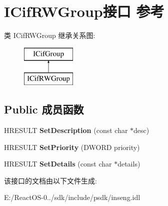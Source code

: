\hypertarget{interface_i_cif_r_w_group}{}\section{I\+Cif\+R\+W\+Group接口 参考}
\label{interface_i_cif_r_w_group}
类 I\+Cif\+R\+W\+Group 继承关系图\+:\begin{figure}[H]
\begin{center}
\leavevmode
\includegraphics[height=2.000000cm]{interface_i_cif_r_w_group}
\end{center}
\end{figure}
\subsection*{Public 成员函数}
\begin{DoxyCompactItemize}
\item 
\mbox{\label{interface_i_cif_r_w_group_a32143fc1e49c200e6232a28ea0071575}} 
H\+R\+E\+S\+U\+LT {\bfseries Set\+Description} (const char $\ast$desc)
\item 
\mbox{\label{interface_i_cif_r_w_group_a27e2ee6c593c26b9dc794818f52ccca5}} 
H\+R\+E\+S\+U\+LT {\bfseries Set\+Priority} (D\+W\+O\+RD priority)
\item 
\mbox{\label{interface_i_cif_r_w_group_af4a89869121225858342b185c0dce55a}} 
H\+R\+E\+S\+U\+LT {\bfseries Set\+Details} (const char $\ast$details)
\end{DoxyCompactItemize}


该接口的文档由以下文件生成\+:\begin{DoxyCompactItemize}
\item 
E\+:/\+React\+O\+S-\/0../sdk/include/psdk/inseng.\+idl\end{DoxyCompactItemize}
